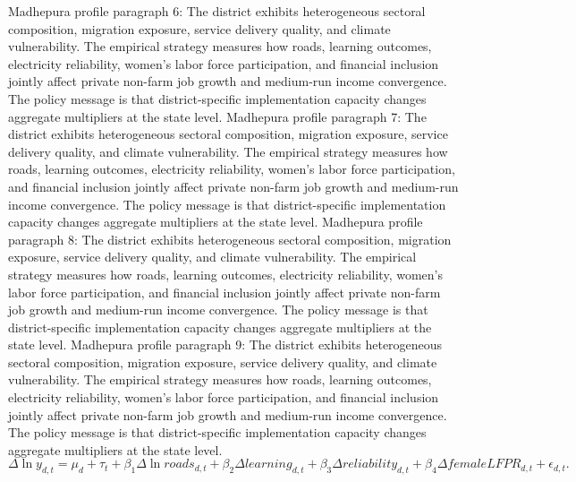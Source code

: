 \documentclass[preprint,12pt]{elsarticle}
\begin{document}
Madhepura profile paragraph 6: The district exhibits heterogeneous sectoral composition, migration exposure, service delivery quality, and climate vulnerability. The empirical strategy measures how roads, learning outcomes, electricity reliability, women's labor force participation, and financial inclusion jointly affect private non-farm job growth and medium-run income convergence. The policy message is that district-specific implementation capacity changes aggregate multipliers at the state level.
Madhepura profile paragraph 7: The district exhibits heterogeneous sectoral composition, migration exposure, service delivery quality, and climate vulnerability. The empirical strategy measures how roads, learning outcomes, electricity reliability, women's labor force participation, and financial inclusion jointly affect private non-farm job growth and medium-run income convergence. The policy message is that district-specific implementation capacity changes aggregate multipliers at the state level.
Madhepura profile paragraph 8: The district exhibits heterogeneous sectoral composition, migration exposure, service delivery quality, and climate vulnerability. The empirical strategy measures how roads, learning outcomes, electricity reliability, women's labor force participation, and financial inclusion jointly affect private non-farm job growth and medium-run income convergence. The policy message is that district-specific implementation capacity changes aggregate multipliers at the state level.
Madhepura profile paragraph 9: The district exhibits heterogeneous sectoral composition, migration exposure, service delivery quality, and climate vulnerability. The empirical strategy measures how roads, learning outcomes, electricity reliability, women's labor force participation, and financial inclusion jointly affect private non-farm job growth and medium-run income convergence. The policy message is that district-specific implementation capacity changes aggregate multipliers at the state level.
\begin{equation}\Delta \ln y_{d,t}=\mu_d+\tau_t+\beta_1\Delta\ln roads_{d,t}+\beta_2\Delta learning_{d,t}+\beta_3\Delta reliability_{d,t}+\beta_4\Delta femaleLFPR_{d,t}+\epsilon_{d,t}.\end{equation}
\end{document}
